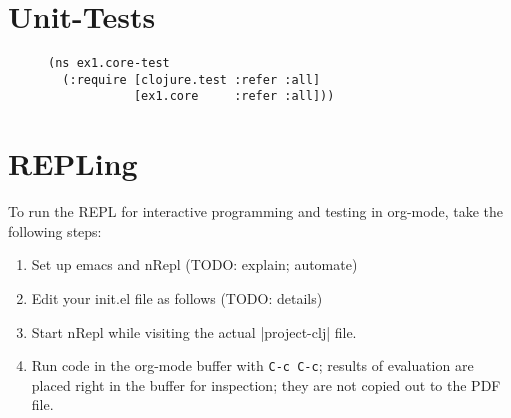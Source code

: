 \documentclass[11pt]{article}
\begin{document}
\section{Unit-Tests}
\label{sec-5}

\begin{figure}[H]
\label{test-namespace}
\begin{verbatim}
(ns ex1.core-test
  (:require [clojure.test :refer :all]
            [ex1.core     :refer :all]))
\end{verbatim}
\end{figure}
\section{REPLing}
\label{sec-6}
\label{sec:emacs-repl}
To run the REPL for interactive programming and testing in org-mode,
take the following steps:
\begin{enumerate}
\item Set up emacs and nRepl (TODO: explain; automate)
\item Edit your init.el file as follows (TODO: details)
\item Start nRepl while visiting the actual |project-clj| file.
\item Run code in the org-mode buffer with \verb|C-c C-c|; results of
evaluation are placed right in the buffer for inspection; they are
not copied out to the PDF file.
\end{enumerate}
\end{document}
